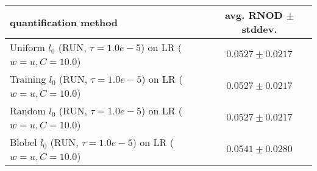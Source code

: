 \begin{tabular}{lc}
  \toprule
  quantification method & avg. RNOD $\pm$ stddev. \\
  \midrule
  Uniform $l_0$ (RUN, $\tau=1.0e-5$) on LR ($w=u, C=10.0$) & $\mathbf{0.0527 \pm 0.0217}$ \\
  Training $l_0$ (RUN, $\tau=1.0e-5$) on LR ($w=u, C=10.0$) & $\mathbf{0.0527 \pm 0.0217}$ \\
  Random $l_0$ (RUN, $\tau=1.0e-5$) on LR ($w=u, C=10.0$) & $\mathbf{0.0527 \pm 0.0217}$ \\
  Blobel $l_0$ (RUN, $\tau=1.0e-5$) on LR ($w=u, C=10.0$) & $\mathbf{0.0541 \pm 0.0280}$ \\
  \bottomrule
\end{tabular}
